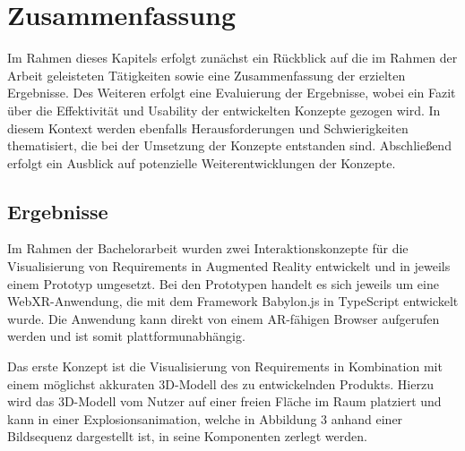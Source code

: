 \chapter{Zusammenfassung}

Im Rahmen dieses Kapitels erfolgt zunächst ein Rückblick auf die im Rahmen der Arbeit geleisteten Tätigkeiten sowie eine Zusammenfassung der erzielten Ergebnisse.
Des Weiteren erfolgt eine Evaluierung der Ergebnisse, wobei ein Fazit über die Effektivität und Usability der entwickelten Konzepte gezogen wird.
In diesem Kontext werden ebenfalls Herausforderungen und Schwierigkeiten thematisiert, die bei der Umsetzung der Konzepte entstanden sind.
Abschließend erfolgt ein Ausblick auf potenzielle Weiterentwicklungen der Konzepte.

\section{Ergebnisse}

Im Rahmen der Bachelorarbeit wurden zwei Interaktionskonzepte für die Visualisierung von Requirements in Augmented Reality entwickelt und in jeweils einem Prototyp umgesetzt.
Bei den Prototypen handelt es sich jeweils um eine WebXR-Anwendung, die mit dem Framework Babylon.js in TypeScript entwickelt wurde.
Die Anwendung kann direkt von einem AR-fähigen Browser aufgerufen werden und ist somit plattformunabhängig.

Das erste Konzept ist die Visualisierung von Requirements in Kombination mit einem möglichst akkuraten 3D-Modell des zu entwickelnden Produkts.
Hierzu wird das 3D-Modell vom Nutzer auf einer freien Fläche im Raum platziert und kann in einer Explosionsanimation, welche in Abbildung 3 anhand einer Bildsequenz dargestellt ist, in seine Komponenten zerlegt werden.

